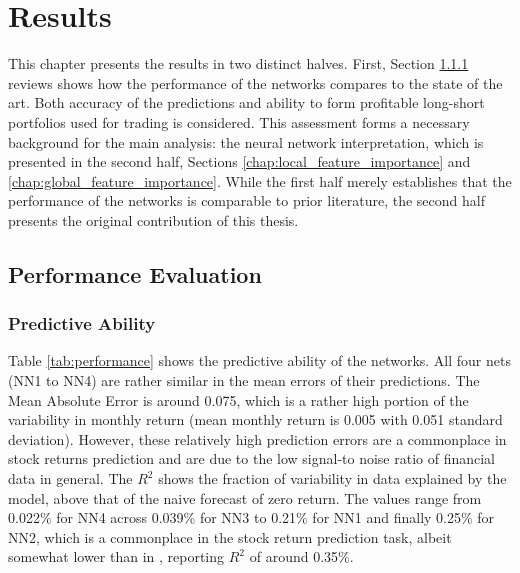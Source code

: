 \chapter{Results}
\label{chap:res}

This chapter presents the results in two distinct halves. First, Section \ref{chap:predictive_ability} reviews shows how the performance of the networks compares to the state of the art. Both accuracy of the predictions and ability to form profitable long-short portfolios used for trading is considered. This assessment forms a necessary background for the main analysis: the neural network interpretation, which is presented in the second half, Sections \ref{chap:local_feature_importance} and \ref{chap:global_feature_importance}. While the first half merely establishes that the performance of the networks is comparable to prior literature, the second half presents the original contribution of this thesis. 

\section{Performance Evaluation}
	
	\subsection{Predictive Ability}
		\label{chap:predictive_ability}
	
		Table \ref{tab:performance} shows the predictive ability of the networks. All four nets (NN1 to NN4) are rather similar in the mean errors of their predictions. The Mean Absolute Error is around 0.075, which is a rather high portion of the variability in monthly return (mean monthly return is 0.005 with 0.051 standard deviation).  However, these relatively high prediction errors are a commonplace in stock returns prediction and are due to the low signal-to noise ratio of financial data in general. The $R^2$ shows the fraction of variability in data explained by the model, above that of the naive forecast of zero return. The values range from 0.022\% for NN4 across 0.039\% for NN3 to 0.21\% for NN1 and finally 0.25\% for NN2, which is a commonplace in the stock return prediction task, albeit somewhat lower than in \cite{gu2020empirical}, reporting $R^2$ of around 0.35\%. 
		
